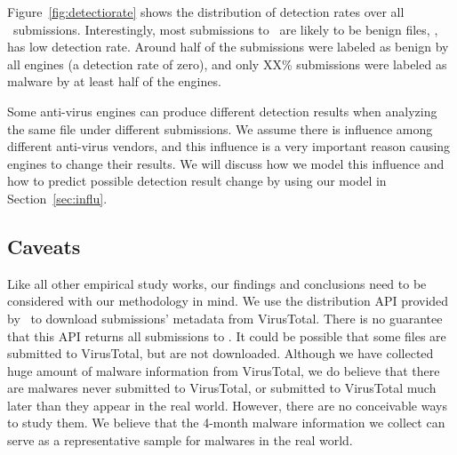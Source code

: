 Figure~\ref{fig:detectiorate} shows the distribution of detection rates over all \pe\ submissions.
Interestingly, most submissions to \vt\ are likely to be benign files, \ie, has low detection rate.
Around half of the submissions were labeled as benign by all engines (a detection rate of zero),
and only XX\%  submissions were labeled as malware by at least half of the engines.

Some anti-virus engines can produce different detection results when analyzing the same file under different submissions.
We assume there is influence among different anti-virus vendors, 
and this influence is a very important reason causing engines to change their results.
We will discuss how we model this influence and how to predict possible detection result change by using our model in Section~\ref{sec:influ}.
\fi

\subsection{Caveats}
Like all other empirical study works, 
our findings and conclusions need to be considered with our methodology in mind. 
We use the distribution API provided by \vt\ to download submissions' metadata 
from VirusTotal. 
There is no guarantee that this API returns all submissions to \vt.
It could be possible that some files are submitted to VirusTotal, 
but are not downloaded. %
Although we have collected huge amount of malware information from VirusTotal,
we do believe that there are malwares never submitted to VirusTotal, 
or submitted to VirusTotal much later than they appear in the real world. 
However, there are no conceivable ways to study them.
We believe that the 4-month malware information we collect can serve as a representative sample for malwares in the real world. 
